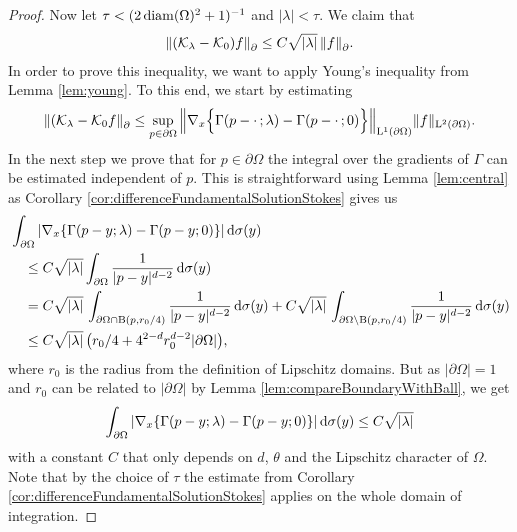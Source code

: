 \begin{proof}
  Now let $\tau < (2 \operatorname{diam}(\Omega)^2 + 1)^{-1}$ and $|\lambda| < \tau$.
  We claim that
  \begin{align*}
    \| (\mathcal{K}_\lambda - \mathcal{K}_0) f\|^{}_\partial \leq C \sqrt{|\lambda|}\, \|f\|^{}_\partial.
  \end{align*}
  In order to prove this inequality, we want to apply Young's inequality from Lemma \ref{lem:young}. To this end, we start by estimating
  \begin{align*}
    \| (\mathcal{K}_\lambda - \mathcal{K}_0 f\|^{}_\partial 
    \leq \sup_{p \in \partial\Omega} \Big\| \nabla_x \Big\{ \Gamma(p - \cdot\,; \lambda) - \Gamma(p - \cdot\,; 0) \Big\} \Big\|_{\mathrm{L}^1(\partial\Omega)} \| f\|_{\mathrm{L}^2(\partial\Omega)}.
  \end{align*}
  In the next step we prove that for $p \in \partial\Omega$ the integral over the gradients of $\Gamma$ can be estimated independent of $p$.
  This is straightforward using Lemma \ref{lem:central} as Corollary \ref{cor:differenceFundamentalSolutionStokes} gives us
  \begin{align*}
    &\int_{\partial\Omega} | \nabla_x \{ \Gamma(p - y; \lambda) - \Gamma(p - y; 0) \} | \, {\operatorname{d}\!{\sigma}}(y)\\
    &\quad\leq C \sqrt{|\lambda|} \int_{\partial\Omega} \frac{1}{|p - y|^{d - 2}} \, {\operatorname{d}\!{\sigma}}(y) \\
    &\quad= C \sqrt{|\lambda|}\, \int_{\partial\Omega \cap \mathrm{B}(p, r_0/4)} \frac{1}{|p - y|^{d - 2}} \, {\operatorname{d}\!{\sigma}}(y) + C \sqrt{|\lambda|}\, \int_{\partial\Omega \setminus \mathrm{B}(p, r_0/4)} \frac{1}{|p - y|^{d - 2}} \, {\operatorname{d}\!{\sigma}}(y) \\
    &\quad\leq C \sqrt{|\lambda|} \,\big( r_0/4 + 4^{2 - d} r_0^{d - 2} |\partial\Omega| \big),
  \end{align*}
  where $r_0$ is the radius from the definition of Lipschitz domains.
  But as $|\partial\Omega| = 1$ and $r_0$ can be related to $|\partial\Omega|$ by Lemma \ref{lem:compareBoundaryWithBall}, we get
  \begin{align*}
    \int_{\partial\Omega} |\nabla_x \{\Gamma(p - y; \lambda) - \Gamma(p - y; 0) \} | \, {\operatorname{d}\!{\sigma}}(y) \leq C \sqrt{|\lambda|}
  \end{align*}
  with a constant $C$ that only depends on $d$, $\theta$ and the Lipschitz character of $\Omega$.
  Note that by the choice of $\tau$ the estimate from Corollary \ref{cor:differenceFundamentalSolutionStokes} applies on the whole domain of integration.


\end{proof}
